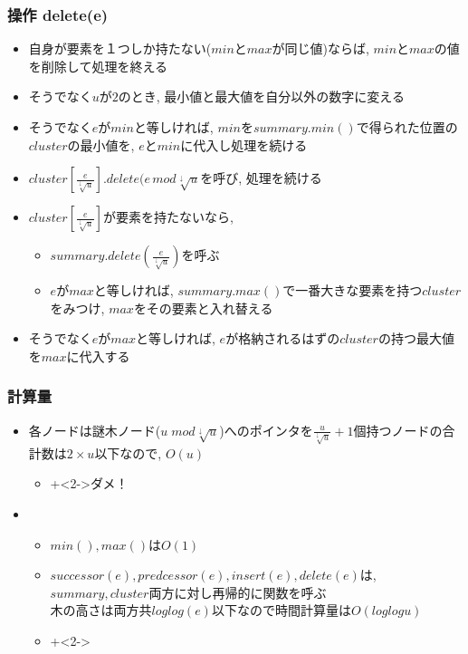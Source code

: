 \documentclass[dvipdfmx,12pt,notheorems]{beamer}
\theoremstyle{definition}
\begin{document}
\begin{frame}\frametitle{操作\; delete(e)}
\begin{itemize}
\item 自身が要素を１つしか持たない($min$と$max$が同じ値)ならば, $min$と$max$の値を削除して処理を終える
\item そうでなく$u$が$2$のとき, 最小値と最大値を自分以外の数字に変える
\item そうでなく$e$が$min$と等しければ, $min$を$summary.min()$で得られた位置の$cluster$の最小値を, \alert{$e$}と$min$に代入し処理を続ける
\item $cluster[\frac{e}{\sqrt[\downarrow]{u}}].delete(e\, mod \sqrt[\downarrow]{u}$を呼び, 処理を続ける
\item $cluster[\frac{e}{\sqrt[\downarrow]{u}}]$が要素を持たないなら, \\
	\begin{itemize} \item $summary.delete(\frac{e}{\sqrt[\downarrow]{u}})$を呼ぶ
					\item $e$が$max$と等しければ, $summary.max()$で一番大きな要素を持つ$cluster$をみつけ, $max$をその要素と入れ替える\end{itemize}
\item そうでなく$e$が$max$と等しければ, $e$が格納されるはずの$cluster$の持つ最大値を$max$に代入する
\end{itemize}
\end{frame}

\begin{frame}\frametitle{計算量}
\begin{itemize}
\item {}
\par \hspace{1em} 各ノードは謎木ノード($u \; mod\sqrt[\downarrow]{u}$)へのポインタを$\frac{u}{\sqrt[\downarrow]{u}}+1$個持つノードの合計数は$2\times u$以下なので, $O(u)$
\begin{itemize} \item \onslide+<2->{\alert{\large{ダメ！}}}\end{itemize}
\item {}
\begin{itemize}
\item $min(), max()$は$O(1)$
\item $successor(e), predcessor(e), insert(e), delete(e)$は, $summary, cluster$両方に対し再帰的に関数を呼ぶ\\
木の高さは両方共$loglog(e)$以下なので時間計算量は$O(loglogu)$
\end{itemize}
\begin{itemize} \item \onslide+<2->{}\end{itemize}
\end{itemize}
\end{frame}
\end{document}
